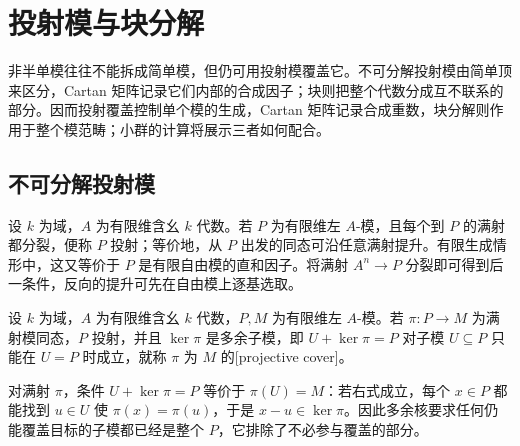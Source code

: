 
\section{投射模与块分解}
\label{b5:sec:0802}


%
%

非半单模往往不能拆成简单模，但仍可用投射模覆盖它。不可分解投射模由简单顶来区分，Cartan 矩阵记录它们内部的合成因子；块则把整个代数分成互不联系的部分。因而投射覆盖控制单个模的生成，Cartan 矩阵记录合成重数，块分解则作用于整个模范畴；小群的计算将展示三者如何配合。

\subsection{不可分解投射模}
\label{b5:subsec:0802:01}

设 \(k\) 为域，\(A\) 为有限维含幺 \(k\) 代数。若 \(P\) 为有限维左 \(A\)-模，且每个到 \(P\) 的满射都分裂，便称 \(P\) 投射；等价地，从 \(P\) 出发的同态可沿任意满射提升。有限生成情形中，这又等价于 \(P\) 是有限自由模的直和因子。将满射 \(A^n\to P\) 分裂即可得到后一条件，反向的提升可先在自由模上逐基选取。
\begin{definition}\label{b5:def:modular-projective-cover}
	设 \(k\) 为域，\(A\) 为有限维含幺 \(k\) 代数，\(P,M\) 为有限维左 \(A\)-模。若 \(\pi:P\to M\) 为满射模同态，\(P\) 投射，并且 \(\ker\pi\) 是多余子模，即 \(U+\ker\pi=P\) 对子模 \(U\subseteq P\) 只能在 \(U=P\) 时成立，就称 \(\pi\) 为 \(M\) 的[projective cover]。
\end{definition}
对满射 \(\pi\)，条件 \(U+\ker\pi=P\) 等价于 \(\pi(U)=M\)：若右式成立，每个 \(x\in P\) 都能找到 \(u\in U\) 使 \(\pi(x)=\pi(u)\)，于是 \(x-u\in\ker\pi\)。因此多余核要求任何仍能覆盖目标的子模都已经是整个 \(P\)，它排除了不必参与覆盖的部分。


